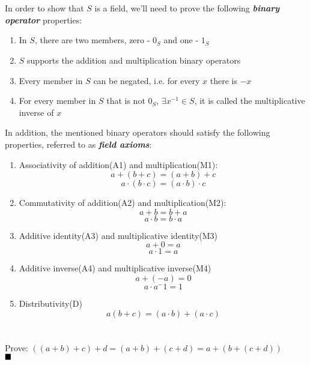 \documentclass[a4paper, 12pt]{article}
\newcommand{\qed}{\\\ensuremath{\\\blacksquare}}
\begin{document}
\begin{titlepage}
\end{titlepage}

\section{}
In order to show that $S$ is a field, we'll need to prove the following \textit{\textbf{binary operator}} properties:
\begin{enumerate}
    \item In $S$, there are two members, zero - $0_S$ and one - $1_S$
    \item $S$ supports the addition and multiplication binary operators
    \item Every member in $S$ can be negated, i.e. for every $x$ there is $-x$
    \item For every member in $S$ that is not $0_S$, $\exists{x^{-1}}\in{S}$, it is called the multiplicative inverse of $x$
\end{enumerate}
In addition, the mentioned binary operators should satisfy the following properties, referred to as \textit{\textbf{field axioms}}:
\begin{enumerate}
    \item Associativity of addition(A1) and multiplication(M1):
        $$ a+(b+c)=(a+b)+c $$
        $$ a\cdot(b\cdot{c})=(a\cdot{b})\cdot{c} $$
    \item Commutativity of addition(A2) and multiplication(M2):
        $$ a+b = b+a $$
        $$ a\cdot{b} = b\cdot{a} $$
    \item Additive identity(A3) and multiplicative identity(M3)
        $$ a+0=a $$
        $$ a\cdot{1}=a $$
    \item Additive inverse(A4) and multiplicative inverse(M4)
        $$ a + (-a) = 0 $$
        $$ a \cdot a^-1 = 1 $$
    \item Distributivity(D)
        $$ a(b + c) = (a \cdot{b})+(a \cdot{c}) $$
\end{enumerate}
\pagebreak

\section{}
Prove: $ ((a + b) + c) + d = (a + b) + (c + d) = a + (b + (c + d)) $
\qed
\end{document}
